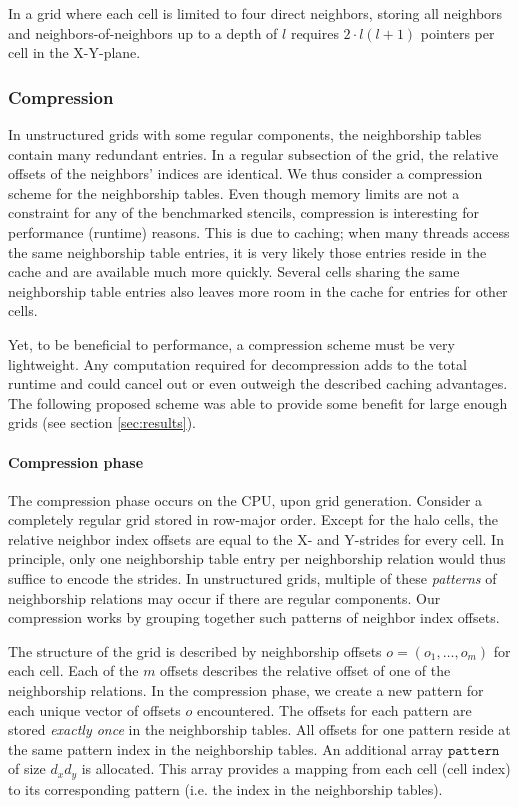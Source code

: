 In a grid where each cell is limited to four direct neighbors, storing all neighbors and neighbors-of-neighbors up to a depth of $l$ requires $2\cdot l(l+1)$ pointers per cell in the X-Y-plane.

\subsubsection{Compression} \label{sec:compression}

In unstructured grids with some regular components, the neighborship tables contain many redundant entries. In a regular subsection of the grid, the relative offsets of the neighbors' indices are identical. We thus consider a  compression scheme for the neighborship tables. Even though memory limits are not a constraint for any of the benchmarked stencils, compression is interesting for performance (runtime) reasons. This is due to caching; when many threads access the same neighborship table entries, it is very likely those entries reside in the cache and are available much more quickly. Several cells sharing the same neighborship table entries also leaves more room in the cache for entries for other cells.

Yet, to be beneficial to performance, a compression scheme must be very lightweight. Any computation required for decompression adds to the total runtime and could cancel out or even outweigh the described caching advantages. The following proposed scheme was able to provide some benefit for large enough grids (see section \ref{sec:results}). %

\paragraph{Compression phase}

The compression phase occurs on the CPU, upon grid generation. Consider a completely regular grid stored in row-major order. Except for the halo cells, the relative neighbor index offsets are equal to the X- and Y-strides for every cell. In principle, only one neighborship table entry per neighborship relation would thus suffice to encode the strides. In unstructured grids, multiple of these \emph{patterns} of neighborship relations may occur if there are regular components. Our compression works by grouping together such patterns of neighbor index offsets. 

The structure of the grid is described by neighborship offsets $o = (o_1, \dots, o_m)$ for each cell. Each of the $m$ offsets describes the relative offset of one of the neighborship relations. In the compression phase, we create a new pattern for each unique vector of offsets $o$ encountered. The offsets for each pattern are stored \emph{exactly once} in the neighborship tables. All offsets for one pattern reside at the same pattern index in the neighborship tables. An additional array $\mathtt{pattern}$ of size $d_xd_y$ is allocated. This array provides a mapping from each cell (cell index) to its corresponding pattern (i.e. the index in the neighborship tables).


